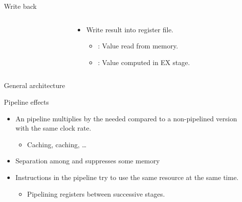 \begin{frame}[t]{Write back}
\begin{columns}
\begin{column}{.3\textwidth}

\end{column}
\begin{column}{.5\textwidth}
\begin{itemize}
  \item Write result into register file.
    \begin{itemize}
      \item {}:
            Value read from memory.
      \item {}:
            Value computed in EX stage.
    \end{itemize}
\end{itemize}
\end{column}
\end{columns}
\end{frame}

\begin{frame}[t]{General architecture}

\end{frame}

\begin{frame}[t]{Pipeline effects}
\begin{itemize}
  \item An   pipeline 
  multiplies by  the needed  
  compared to a non-pipelined version with the same  clock rate.
    \begin{itemize}
      \item Caching, caching, \ldots
    \end{itemize}

  \item Separation among  and  
         suppresses some memory  

  \item Instructions in the pipeline  try to use
        the same resource at the same time.
    \begin{itemize}
      \item Pipelining registers between successive stages.
    \end{itemize}
\end{itemize}
\end{frame}

